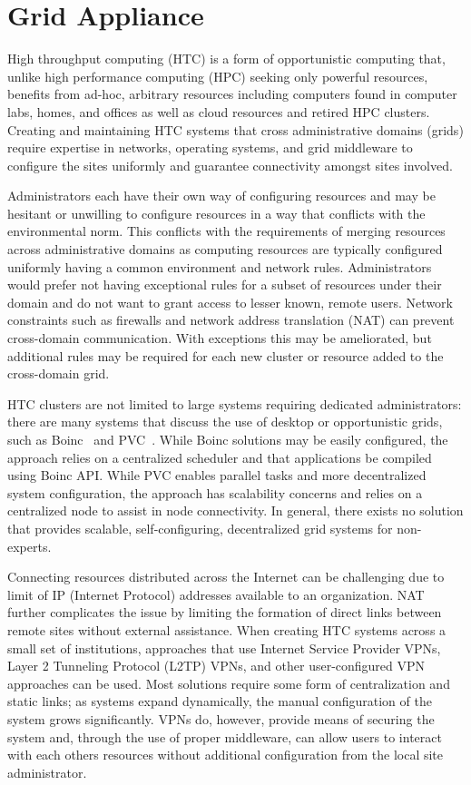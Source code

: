 \chapter{Grid Appliance}
\label{gridappliance}
High throughput computing (HTC) is a form of opportunistic computing that,
unlike high performance computing (HPC) seeking only powerful resources,
benefits from ad-hoc, arbitrary resources including computers found in computer
labs, homes, and offices as well as cloud resources and retired HPC clusters.
Creating and maintaining HTC systems that cross administrative domains (grids)
require expertise in networks, operating systems, and grid middleware to
configure the sites uniformly and guarantee connectivity amongst sites involved.

Administrators each have their own way of configuring resources and may be
hesitant or unwilling to configure resources in a way that conflicts with the
environmental norm.  This conflicts with the requirements of merging resources
across administrative domains as computing resources are typically configured
uniformly having a common environment and network rules.  Administrators would
prefer not having exceptional rules for a subset of resources under their
domain and do not want to grant access to lesser known, remote users.  Network
constraints such as firewalls and network address translation (NAT) can prevent
cross-domain communication.  With exceptions this may be ameliorated, but
additional rules may be required for each new cluster or resource added to the
cross-domain grid.

HTC clusters are not limited to large systems requiring dedicated
administrators: there are many systems that discuss the use of desktop or
opportunistic grids, such as Boinc~\cite{boinc} and PVC~\cite{pvc}.  While Boinc
solutions may be easily configured, the approach relies on a centralized
scheduler and that applications be compiled using Boinc API.  While PVC
enables parallel tasks and more decentralized system configuration, the
approach has scalability concerns and relies on a centralized node to assist in
node connectivity.  In general, there exists no solution that provides
scalable, self-configuring, decentralized grid systems for non-experts.

Connecting resources distributed across the Internet can be challenging due to
limit of IP (Internet Protocol) addresses available to an organization.  NAT
further complicates the issue by limiting the formation of direct links between
remote sites without external assistance.  When creating HTC systems across a
small set of institutions, approaches that use Internet Service Provider VPNs,
Layer 2 Tunneling Protocol (L2TP) VPNs, and other user-configured VPN
approaches can be used.  Most solutions require some form of centralization
and static links; as systems expand dynamically, the manual configuration of
the system grows significantly.  VPNs do, however, provide means of securing
the system and, through the use of proper middleware, can allow users to
interact with each others resources without additional configuration from the
local site administrator.

